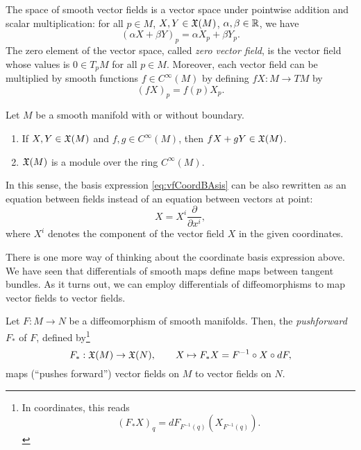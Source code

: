 The space of smooth vector fields is a vector space under pointwise addition and scalar multiplication: for all $p\in M$, $X,Y\in\mathfrak{X}(M)$, $\alpha, \beta \in \mathbb{R}$, we have
\begin{equation}
    (\alpha X + \beta Y)_p = \alpha X_p + \beta Y_p.
\end{equation}
The zero element of the vector space, called \emph{zero vector field}, is the vector field whose values is $0\in T_pM$ for all $p\in M$.
Moreover, each vector field can be multiplied by smooth functions $f\in C^\infty(M)$ by defining $fX:M\to  TM$ by
\begin{equation}
    (fX)_p = f(p)X_p.
\end{equation}

\begin{prop}
    Let $M$ be a smooth manifold with or without boundary.
    \begin{enumerate}
        \item If $X,Y \in \mathfrak{X}(M)$ and $f,g\in C^\infty(M)$, then $fX+gY \in\mathfrak{X}(M)$.
        \item $\mathfrak{X}(M)$ is a module over the ring $C^\infty(M)$.
    \end{enumerate}
\end{prop}

In this sense, the basis expression \eqref{eq:vfCoordBAsis} can be also rewritten as an equation between fields instead of an equation between vectors at point:
\begin{equation}\label{eq:vfCoordBAsis}
    X = X^i \frac{\partial}{\partial x^i},
\end{equation}
where $X^i$ denotes the component of the vector field $X$ in the given coordinates.

There is one more way of thinking about the coordinate basis expression above.
We have seen that differentials of smooth maps define maps between tangent bundles.
As it turns out, we can employ differentials of diffeomorphisms to map vector fields to vector fields.

\begin{defn}
    Let $F:M\to N$ be a diffeomorphism of smooth manifolds.
    Then, the \emph{pushforward} $F_*$ of $F$, defined by\footnote{In coordinates, this reads\begin{equation}
        (F_* X)_q = dF_{F^{-1}(q)}(X_{F^{-1}(q)}).
    \end{equation}}
    \begin{equation}
        F_*: \mathfrak{X}(M) \to \mathfrak{X}(N),\qquad
        X \mapsto F_* X = F^{-1} \circ X \circ d F,
    \end{equation}
    maps (``pushes forward'') vector fields on $M$ to vector fields on $N$.
\end{defn}

